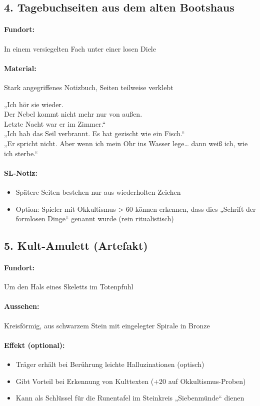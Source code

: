\subsection*{4. Tagebuchseiten aus dem alten Bootshaus}
\paragraph{Fundort:} In einem versiegelten Fach unter einer losen Diele
\paragraph{Material:} Stark angegriffenes Notizbuch, Seiten teilweise verklebt
\begin{displayquote}
„Ich hör sie wieder.\\
Der Nebel kommt nicht mehr nur von außen.\\
Letzte Nacht war er im Zimmer.“\\
„Ich hab das Seil verbrannt. Es hat gezischt wie ein Fisch.“\\
„Er spricht nicht. Aber wenn ich mein Ohr ins Wasser lege… dann weiß ich, wie ich sterbe.“
\end{displayquote}
\paragraph{SL-Notiz:}
\begin{itemize}
\item Spätere Seiten bestehen nur aus wiederholten Zeichen
\item Option: Spieler mit Okkultismus > 60 können erkennen, dass dies „Schrift der formlosen Dinge“ genannt wurde (rein ritualistisch)
\end{itemize}

\subsection*{5. Kult-Amulett (Artefakt)}
\paragraph{Fundort:} Um den Hals eines Skeletts im Totenpfuhl
\paragraph{Aussehen:} Kreisförmig, aus schwarzem Stein mit eingelegter Spirale in Bronze
\paragraph{Effekt (optional):}
\begin{itemize}
\item Träger erhält bei Berührung leichte Halluzinationen (optisch)
\item Gibt Vorteil bei Erkennung von Kulttexten (+20 auf Okkultismus-Proben)
\item Kann als Schlüssel für die Runentafel im Steinkreis „Siebenmünde“ dienen
\end{itemize}
